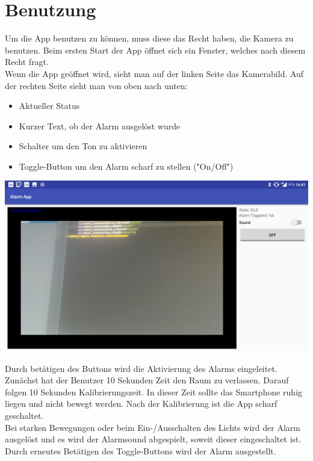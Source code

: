 \documentclass[11pt]{article}
\begin{document}
\section{Benutzung}
Um die App benutzen zu k{\"o}nnen, muss diese das Recht haben, die Kamera zu benutzen. Beim ersten Start der App {\"o}ffnet sich ein Fenster, welches nach diesem Recht fragt.\\
Wenn die App ge{\"o}ffnet wird, sieht man auf der linken Seite das Kamerabild. Auf der rechten Seite sieht man von oben nach unten:
\begin{itemize}
	\item Aktueller Status
	\item Kurzer Text, ob der Alarm ausgel{\"o}st wurde
	\item Schalter um den Ton zu aktivieren
	\item Toggle-Button um den Alarm scharf zu stellen ("On/Off")
\end{itemize}
\begin{center}
	\includegraphics[scale=0.2]{clean-shot.png}
\end{center}
Durch bet{\"a}tigen des Buttons wird die Aktivierung des Alarms eingeleitet. Zun{\"a}chst hat der Benutzer 10 Sekunden Zeit den Raum zu verlassen. Darauf folgen 10 Sekunden Kalibrierungszeit. In dieser Zeit sollte das Smartphone ruhig liegen und nicht bewegt werden. Nach der Kalibrierung ist die App scharf geschaltet. \\
Bei starken Bewegungen oder beim Ein-/Ausschalten des Lichts wird der Alarm ausgel{\"o}st und es wird der Alarmsound abgespielt, soweit dieser eingeschaltet ist. Durch erneutes Bet{\"a}tigen des Toggle-Buttons wird der Alarm ausgestellt.
\end{document}

